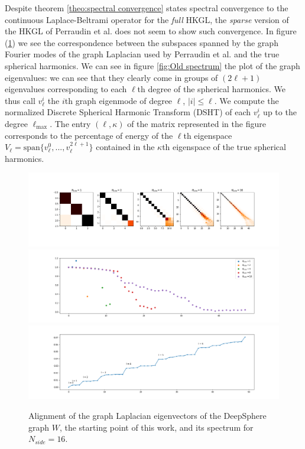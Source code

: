  Despite theorem \ref{theo:spectral convergence} \cite{Belkin:2005:TTF:2138147.2138189} states spectral convergence to the continuous Laplace-Beltrami operator for the \textit{full} HKGL, the \textit{sparse} version of the HKGL of Perraudin et al. does not seem to show such convergence. In figure (\ref{fig:Old spectrum1}) we see the correspondence between the subspaces spanned by the graph Fourier modes of the graph Laplacian used by Perraudin et al. and the true spherical harmonics. We can see in figure \ref{fig:Old spectrum} the plot of the graph eigenvalues: we can see that they clearly come in groups of $(2\ell+1)$ eigenvalues corresponding to each $\ell$th degree of the spherical harmonics. We thus call $v_\ell^i$ the $i$th graph eigenmode of degree $\ell$, $|i|\leq\ell$. We compute the normalized Discrete Spherical Harmonic Transform (DSHT) of each $v^i_\ell$ up to the degree $\ell_\text{max}$. The entry $(\ell, \kappa)$ of the matrix represented in the figure corresponds to the percentage of energy of the $\ell$th eigenspace $V_\ell = \text{span}\{v^0_\ell, ..., v^{2\ell+1}_\ell\}$ contained in the $\kappa$th eigenspace of the true spherical harmonics. 
\begin{figure}[h]
	\begin{center}
		\includegraphics[width=1\linewidth]{../codes/02.HeatKernelGraphLaplacian/HEALPix/06_figures/deepsphere_original.png}
		\includegraphics[width=1\linewidth]{../codes/02.HeatKernelGraphLaplacian/HEALPix/06_figures/deepsphere_original_diagonal.png}
		\includegraphics[width=1\linewidth]{../codes/02.HeatKernelGraphLaplacian/HEALPix/05_figs/old_results3.png}
	\end{center}
	\caption{\label{fig:Old spectrum1}Alignment of the graph Laplacian eigenvectors of the DeepSphere graph $W$, the starting point of this work, and its spectrum for $N_{side}=16$.}
\end{figure} 
